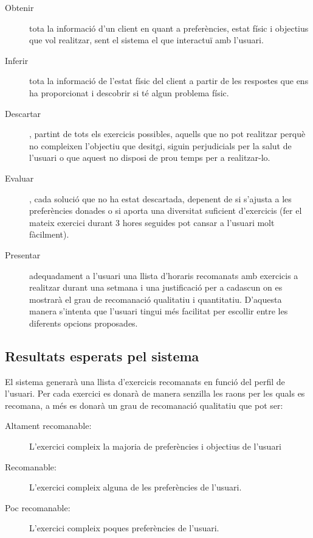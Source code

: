 \documentclass[a4paper, 12pt, UTF8]{article}
\begin{document}
\begin{description}
	\item[Obtenir] tota la informació d'un client en quant a preferències, estat físic i objectius que vol realitzar, sent el sistema el que interactuï amb l'usuari.
	
	\item[Inferir] tota la informació de l'estat físic del client a partir de les respostes que ens ha proporcionat i descobrir si té algun problema físic.
	
	\item[Descartar], partint de tots els exercicis possibles, aquells que no pot realitzar perquè no compleixen l'objectiu que desitgi, siguin perjudicials per la salut de l'usuari o que aquest no disposi de prou temps per a realitzar-lo.
	
	\item[Evaluar], cada solució que no ha estat descartada, depenent de si s'ajusta a les preferències donades o si aporta una diversitat suficient d'exercicis (fer el mateix exercici durant 3 hores seguides pot cansar a l'usuari molt fàcilment).
	
	\item[Presentar] adequadament a l'usuari una llista d'horaris recomanats amb exercicis a realitzar durant una setmana i una justificació per a cadascun	 on es mostrarà el grau de recomanació qualitatiu i quantitatiu. D'aquesta manera s'intenta que l'usuari tingui més facilitat per escollir entre les diferents opcions proposades.
\end{description}

\subsection{Resultats esperats pel sistema}

El sistema generarà una llista d'exercicis recomanats en funció del perfil de l'usuari. Per cada exercici es donarà de manera senzilla les raons per les quals es recomana, a més es donarà un grau de recomanació qualitatiu que pot ser:

\begin{description}
	\item[Altament recomanable:] L'exercici compleix la majoria de preferències i objectius de l'usuari
	\item[Recomanable:] L'exercici compleix alguna de les preferències de l'usuari.
	\item[Poc recomanable:] L'exercici compleix poques preferències de l'usuari.
\end{description}
\end{document}
